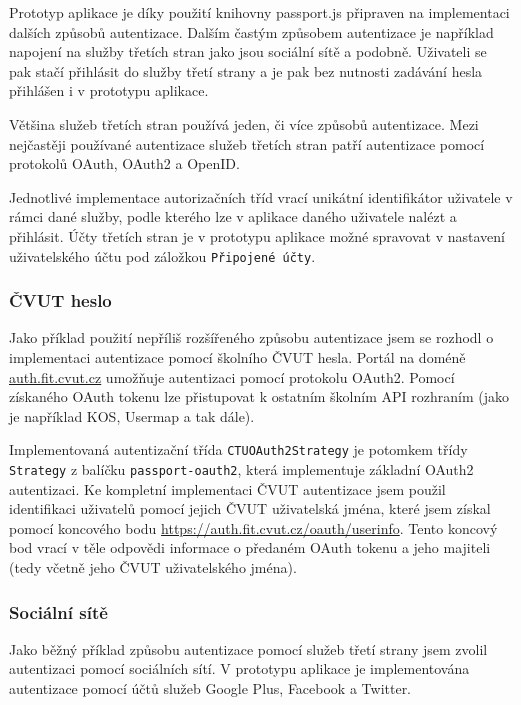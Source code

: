 Prototyp aplikace je díky použití knihovny passport.js připraven na implementaci dalších způsobů autentizace.
Dalším častým způsobem autentizace je například napojení na služby třetích stran jako jsou sociální sítě a podobně.
Uživateli se pak stačí přihlásit do služby třetí strany a je pak bez nutnosti zadávání hesla přihlášen i v prototypu aplikace.

Většina služeb třetích stran používá jeden, či více způsobů autentizace.
Mezi nejčastěji používané autentizace služeb třetích stran patří autentizace pomocí protokolů OAuth, OAuth2 a OpenID.

Jednotlivé implementace autorizačních tříd vrací unikátní identifikátor uživatele v rámci dané služby, podle kterého lze v aplikace daného uživatele nalézt a přihlásit.
Účty třetích stran je v prototypu aplikace možné spravovat v nastavení uživatelského účtu pod záložkou \texttt{Připojené účty}.

\subsubsection{ČVUT heslo}

Jako příklad použití nepříliš rozšířeného způsobu autentizace jsem se rozhodl o implementaci autentizace pomocí školního \acrshort{ČVUT} hesla.
Portál na doméně \href{https://auth.fit.cvut.cz/manager}{auth.fit.cvut.cz} umožňuje autentizaci pomocí protokolu OAuth2.
Pomocí získaného OAuth tokenu lze přistupovat k ostatním školním \gls{API} rozhraním (jako je například KOS, Usermap a tak dále).

Implementovaná autentizační třída \texttt{CTUOAuth2Strategy} je potomkem třídy \texttt{Strategy} z balíčku \texttt{passport-oauth2}, která implementuje základní OAuth2 autentizaci.
Ke kompletní implementaci \acrshort{ČVUT} autentizace jsem použil identifikaci uživatelů pomocí jejich \acrshort{ČVUT} uživatelská jména, které jsem získal pomocí koncového bodu \url{https://auth.fit.cvut.cz/oauth/userinfo}.
Tento koncový bod vrací v těle odpovědi informace o předaném OAuth tokenu a jeho majiteli (tedy včetně jeho \acrshort{ČVUT} uživatelského jména).

\subsubsection{Sociální sítě}

Jako běžný příklad způsobu autentizace pomocí služeb třetí strany jsem zvolil autentizaci pomocí sociálních sítí.
V prototypu aplikace je implementována autentizace pomocí účtů služeb Google Plus, Facebook a Twitter.

